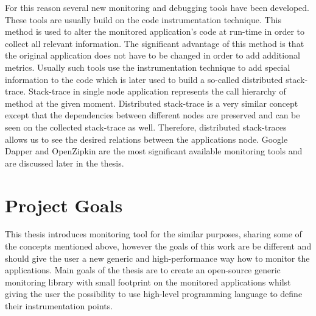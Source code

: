 For this reason several new monitoring and debugging tools have been developed. These tools are usually build on the code instrumentation technique. This method is used to alter the monitored application's code at run-time in order to collect all relevant information. The significant advantage of this method is that the original application does not have to be changed in order to add additional metrics. Usually such tools use the instrumentation technique to add special information to the code which is later used to build a so-called distributed stack-trace.  Stack-trace in single node application represents the call hierarchy of method at the given moment. Distributed stack-trace is a very similar concept except that the dependencies between different nodes are preserved and can be seen on the collected stack-trace as well. Therefore, distributed stack-traces allows us to see the desired relations between the applications node. Google Dapper and OpenZipkin are the most significant available monitoring tools and are discussed later in the thesis. 


\section{Project Goals}
This thesis introduces monitoring tool for the similar purposes, sharing some of the concepts mentioned above, however the goals of this work are be different and should give the user a new generic and high-performance way how to monitor the applications.  Main goals of the thesis are to create an open-source generic monitoring library with small footprint on the monitored applications whilst giving the user the possibility to use high-level programming language to define their instrumentation points.

